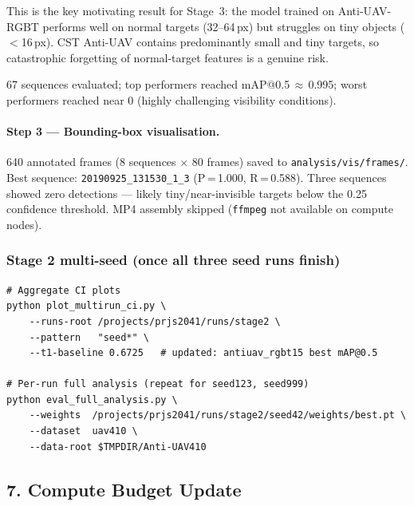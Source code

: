 \noindent This is the key motivating result for Stage~3:
the model trained on Anti-UAV-RGBT performs well on normal targets
(32--64\,px) but struggles on tiny objects ($<$16\,px). CST Anti-UAV
contains predominantly small and tiny targets, so catastrophic
forgetting of normal-target features is a genuine risk.

67 sequences evaluated; top performers reached mAP@0.5\,$\approx$\,0.995;
worst performers reached near 0 (highly challenging visibility conditions).

\paragraph{Step 3 — Bounding-box visualisation.}
640 annotated frames (8 sequences $\times$ 80 frames) saved to
\texttt{analysis/vis/frames/}.
Best sequence: \texttt{20190925\_131530\_1\_3} (P\,=\,1.000, R\,=\,0.588).
Three sequences showed zero detections — likely tiny/near-invisible
targets below the 0.25 confidence threshold.
MP4 assembly skipped (\texttt{ffmpeg} not available on compute nodes).

\subsubsection*{Stage 2 multi-seed (once all three seed runs finish)}

\begin{verbatim}
# Aggregate CI plots
python plot_multirun_ci.py \
    --runs-root /projects/prjs2041/runs/stage2 \
    --pattern   "seed*" \
    --t1-baseline 0.6725   # updated: antiuav_rgbt15 best mAP@0.5

# Per-run full analysis (repeat for seed123, seed999)
python eval_full_analysis.py \
    --weights  /projects/prjs2041/runs/stage2/seed42/weights/best.pt \
    --dataset  uav410 \
    --data-root $TMPDIR/Anti-UAV410
\end{verbatim}

\subsection*{7. Compute Budget Update}

